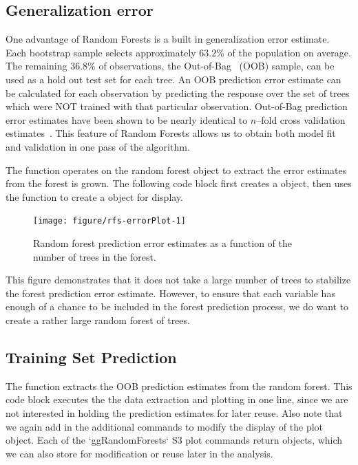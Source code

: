 \documentclass[nojss]{jss}\usepackage[]{graphicx}\usepackage[]{color}
\begin{document}
\subsection{Generalization error}

One advantage of Random Forests is a built in generalization error estimate. Each bootstrap sample selects approximately $63.2\%$ of the population on average. The remaining $36.8\%$ of observations, the Out-of-Bag~\citep{BreimanOOB:1996e} (OOB) sample, can be used as a hold out test set for each tree. An OOB prediction error estimate can be calculated for each observation by predicting the response over the set of trees which were NOT trained with that particular observation. Out-of-Bag prediction error estimates have been shown to be nearly identical to $n$--fold cross validation estimates~\citep{StatisticalLearning:2009}. This feature of Random Forests allows us to obtain both model fit and validation in one pass of the algorithm.


The  function operates on the random forest object to extract the error estimates from the forest is grown. The following code block first creates a  object, then uses the  function to create a  object for display.

\begin{Schunk}
\begin{figure}[!htpb]

{\centering \texttt{[image: figure/rfs-errorPlot-1]} 

}

\caption[Random forest prediction error estimates as a function of the number of trees in the forest]{Random forest prediction error estimates as a function of the number of trees in the forest.\label{fig:errorPlot}}
\end{figure}
\end{Schunk}

This figure demonstrates that it does not take a large number of trees to stabilize the forest prediction error estimate. However, to ensure that each variable has enough of a chance to be included in the forest prediction process, we do want to create a rather large random forest of trees. 

\subsection{Training Set Prediction}\label{S:prediction}

The  function extracts the OOB prediction estimates from the random forest. This code block executes the the data extraction and plotting in one line, since we are not interested in holding the prediction estimates for later reuse. Also note that we again add in the additional  commands to modify the display of the plot object. Each of the `ggRandomForests` S3 plot commands return  objects, which we can also store for modification or reuse later in the analysis. 
\end{document}
